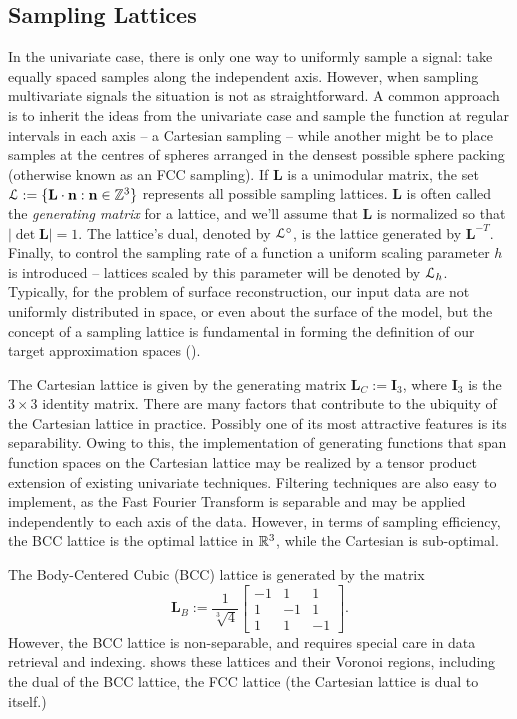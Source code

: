 \subsection{Sampling Lattices} \label{sec:smpl_review}
In the univariate case, there is only one way to uniformly sample a signal: take equally spaced samples along the independent axis. However, when sampling multivariate signals the situation is not as straightforward. A common approach is to inherit the ideas from the univariate case and sample the function at regular intervals in each axis -- a Cartesian sampling --  while another might be to place samples at the centres of spheres arranged in the densest possible sphere packing (otherwise known as an FCC sampling). If $\mathbf{L}$ is a unimodular matrix, the set $\mathcal{L} := \{\mathbf{L}\cdot\mathbf{n} : \mathbf{n} \in \mathbb{Z}^3 \}$ represents all possible sampling lattices. $\mathbf{L}$ is often called the \emph{generating matrix} for a lattice, and we'll assume that $\mathbf{L}$ is normalized so that $\left|\det\mathbf{L}\right| = 1$. The lattice's dual, denoted by $\mathcal{L}^{\circ}$, is the lattice generated by $\mathbf{L}^{-T}$. Finally, to control the sampling rate of a function a uniform scaling parameter $h$ is introduced -- lattices scaled by this parameter will be denoted by $\mathcal{L}_h$. Typically, for the problem of surface reconstruction, our input data are not uniformly distributed in space, or even about the surface of the model, but the concept of a sampling lattice is fundamental in forming the definition of our target approximation spaces ().

The Cartesian lattice is given by the generating matrix $\mathbf{L}_C:=\mathbf{I}_3$, where $\mathbf{I}_3$ is the $3 \times 3$ identity matrix. There are many factors that contribute to the ubiquity of the Cartesian lattice in practice. Possibly one of its most attractive features is its separability. Owing to this, the implementation of generating functions that span function spaces on the Cartesian lattice may be realized by a tensor product extension of existing univariate techniques. Filtering techniques are also easy to implement, as the Fast Fourier Transform is  separable and may be applied independently to each axis of the data. However, in terms of sampling efficiency, the BCC lattice is the optimal lattice in $\mathbb{R}^3$, while the Cartesian is sub-optimal.

The Body-Centered Cubic (BCC) lattice is generated by the matrix  {\footnotesize
\begin{equation*} 
	\mathbf{L}_B := \frac{1}{\sqrt[3]{4}}
	\begin{bmatrix}
		-1 & 1 & 1 \\ 
		1 & -1 & 1 \\ 
		1 & 1 & -1 
	\end{bmatrix}.
\end{equation*}}
However, the BCC lattice is non-separable, and requires special care in data retrieval and indexing.  shows these lattices and their Voronoi regions, including the dual of the BCC lattice, the FCC lattice (the Cartesian lattice is dual to itself.)


